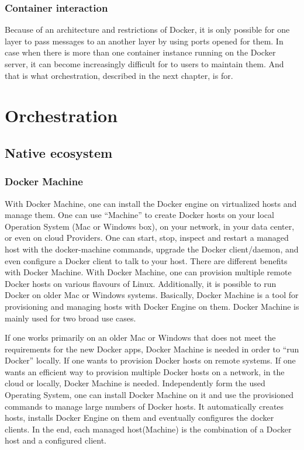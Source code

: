\subsubsection{Container interaction}

Because of an architecture and restrictions of Docker, it is only possible for
one layer to pass messages to an another layer by using ports opened for them.
In case when there is more than one container
instance running on the Docker server, it can become increasingly difficult for
to users to maintain them. And that is what orchestration, described in the next
chapter, is for.

\section{Orchestration}

\subsection{Native ecosystem}



\subsubsection{Docker Machine}

With Docker Machine, one can install the Docker engine on virtualized
hosts and manage them. One can use “Machine” to create Docker
hosts on your local Operation System (Mac or Windows box), on your
network, in your data center, or even on cloud Providers.
One can start, stop, inspect and restart a managed host
with the docker-machine commands, upgrade the Docker client/daemon, and
even configure a Docker client to talk to your host. There are different
benefits with Docker Machine. With Docker Machine, one can provision
multiple remote Docker hosts on various flavours of Linux.
Additionally, it is possible to run Docker on older Mac or Windows systems.
Basically, Docker Machine is a tool for provisioning and
managing hosts with Docker Engine on them.
Docker Machine is mainly used for two broad use cases.

If one works primarily on an older Mac or Windows that
does not meet the requirements for the new Docker apps,
Docker Machine is needed in order to “run Docker” locally.
If one wants to provision Docker hosts on remote systems.
If one wants an efficient way to provision multiple Docker hosts on a network,
in the cloud or locally, Docker Machine is needed.
Independently form the used Operating System, one can install
Docker Machine on it and use the provisioned commands to manage
large numbers of Docker hosts. It automatically creates hosts,
installs Docker Engine on them and eventually
configures the docker clients. In the end, each managed
host(Machine) is the combination of a Docker host and a configured client.

